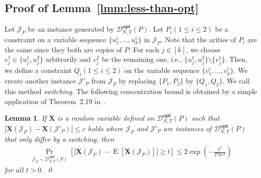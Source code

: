 \documentclass[letterpaper, 11pt]{article}
\newtheorem{lemma}[theorem]{Lemma}
\newcommand{\calD}{\mathcal{D}}
\newcommand{\calJ}{\mathcal{J}}
\newcommand{\bfX}{\mathbf{X}}
\newcommand{\opt}{\mathbf{opt}}
\newcommand{\E}{\mathop{\mathrm{E}}}
\begin{document}
\subsection{Proof of Lemma~\ref{lmm:less-than-opt}}\label{sec:less-than-opt}
Let $\calJ_P$ be an instance generated by $\calD_{N,T}^{\opt}(P)$.
Let $P_i(1\leq i\leq 2)$ be a constraint on a variable sequence $\{u_1^i,\ldots,u_k^i\}$ in $\calJ_P$.
Note that the arities of $P_i$ are the same since they both are copies of $P$.
For each $j\in [k]$,
we choose $v_j^1 \in \{u_j^1,u_j^2\}$ arbitrarily and $v_j^2$ be the remaining one, i.e., $\{u_j^1,u_j^2\} \setminus \{v_j^1\}$.
Then, we define a constraint $Q_i(1\leq i\leq 2)$ on the variable sequence $\{v_1^i,\ldots,v_k^i\}$.
We create another instance $\calJ'_P$ from $\calJ_P$ by replacing $\{P_1,P_2\}$ by $\{Q_1,Q_2\}$.
We call this method \textit{switching}.
The following concentration bound is obtained by a simple application of Theorem~2.19 in~\cite{Wor99}.
\begin{lemma}\label{lmm:chernoff-reg}
  If $\bfX$ is a random variable defined on $\calD_{N,T}^{\opt}(P)$ such that $|\bfX(\calJ_P)-\bfX(\calJ'_P)|\leq c$ holds where $\calJ_P$ and $\calJ'_P$ are instances of $\calD_{N,T}^{\opt}(P)$ that only differ by a switching,
  then
  \begin{eqnarray*}
    \Pr_{\calJ_P\sim \calD_{N,T}^{\opt}(P)}\left[ \left|\bfX(\calJ_P)-\E[\bfX(\calJ_P)] \right| \geq t\right] \leq 2\exp\left(-\frac{t^2}{TN c^2}\right)
  \end{eqnarray*}
  for all $t>0$.
  \qed
\end{lemma}
\end{document}
